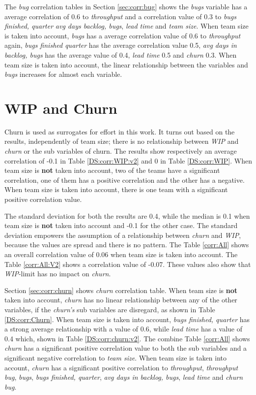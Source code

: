 \documentclass[UKenglish]{ifimaster}  %
\begin{document}
The \textit{bug} correlation tables in Section  \ref{sec:corr:bug} shows the \textit{bugs} variable has a average correlation of 0.6 to \textit{throughput} and a correlation value of 0.3 to \textit{bugs finished, quarter} \textit{avg days backlog, bugs}, \textit{lead time} and \textit{team size}. When team size is taken into account, \textit{bugs} has a average correlation value of 0.6 to \textit{throughput} again, \textit{bugs finished quarter} has the average correlation value 0.5, \textit{avg days in backlog, bugs} has the average value of 0.4, \textit{lead time} 0.5 and \textit{churn} 0.3. When team size is taken into account, the linear relationship between the variables and \textit{bugs} increases for almost each variable.
 

\section{WIP and Churn}
Churn is used as surrogates for effort in this work. It turns out based on the results, independently of  team size; there is no relationship between \textit{WIP} and \textit{churn} or the sub variables of churn. The results show respectively an average correlation of -0.1 in Table \ref{DS:corr:WIP:v2} and 0 in Table \ref{DS:corr:WIP}. When team size is \textbf{not} taken into account, two of the teams have a significant correlation, one of them has a positive correlation and the other has a negative. When team size is taken into account, there is one team with a significant positive correlation value.

The standard deviation for both the results are 0.4, while the median is 0.1 when team size is \textbf{not} taken into account and -0.1 for the other case. The standard deviation empowers the assumption of a relationship between \textit{churn} and \textit{WIP}, because the values are spread and there is no pattern.  The Table \ref{corr:All} shows an overall correlation value of 0.06 when team size is taken into account. The Table \ref{corr:All:V2} shows a correlation value of -0.07. These values also show that \textit{WIP}-limit has no impact on \textit{churn}.

Section \ref{sec:corr:churn} shows \textit{churn} correlation table. When team size is \textbf{not} taken into account, \textit{churn} has no linear relationship between any of the other variables, if the \textit{churn's} sub variables are disregard, as shown in Table \ref{DS:corr:Churn}. When  team size is taken into account, \textit{bugs finished, quarter} has a strong average relationship with a value of 0.6, while \textit{lead time} has a value of 0.4 which, shown in Table \ref{DS:corr:churn:v2}. The combine Table \ref{corr:All} shows \textit{churn} has a significant positive correlation value to both the sub variables and a significant negative correlation to \textit{team size}. When team size is taken into account, \textit{churn} has a significant positive correlation to \textit{throughput}, \textit{throughput bug}, \textit{bugs}, \textit{bugs finished, quarter}, \textit{avg days in backlog, bugs}, \textit{lead time} and \textit{churn bug}. 
\end{document}
